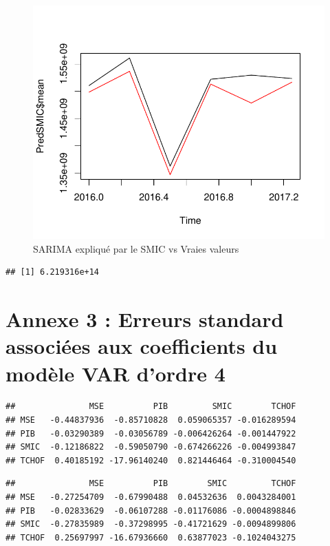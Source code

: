 \documentclass[11pt,]{article}
\begin{document}
\begin{figure}

{\centering \includegraphics{doc_files/figure-latex/unnamed-chunk-60-1} 

}

\caption{\label{fig36} SARIMA expliqué par le SMIC vs Vraies valeurs}\label{fig:unnamed-chunk-60}
\end{figure}

\begin{verbatim}
## [1] 6.219316e+14
\end{verbatim}

\section{\texorpdfstring{Annexe 3 : Erreurs standard associées aux
coefficients du modèle VAR d'ordre 4
\label{Annexe3}}{Annexe 3 : Erreurs standard associées aux coefficients du modèle VAR d'ordre 4 }}\label{annexe-3-erreurs-standard-associees-aux-coefficients-du-modele-var-dordre-4}

\begin{verbatim}
##               MSE          PIB         SMIC        TCHOF
## MSE   -0.44837936  -0.85710828  0.059065357 -0.016289594
## PIB   -0.03290389  -0.03056789 -0.006426264 -0.001447922
## SMIC  -0.12186822  -0.59050790 -0.674266226 -0.004993847
## TCHOF  0.40185192 -17.96140240  0.821446464 -0.310004540
\end{verbatim}

\begin{verbatim}
##               MSE          PIB        SMIC         TCHOF
## MSE   -0.27254709  -0.67990488  0.04532636  0.0043284001
## PIB   -0.02833629  -0.06107288 -0.01176086 -0.0004898846
## SMIC  -0.27835989  -0.37298995 -0.41721629 -0.0094899806
## TCHOF  0.25697997 -16.67936660  0.63877023 -0.1024043275
\end{verbatim}
\end{document}
